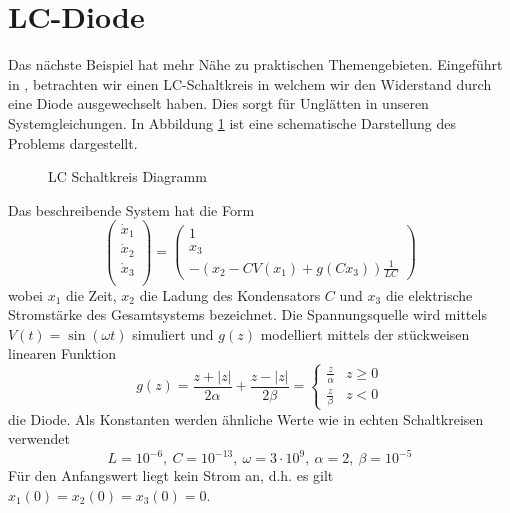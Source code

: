\section{LC-Diode}\label{sec:expLc}
Das nächste Beispiel hat mehr Nähe zu praktischen Themengebieten. Eingeführt in \cite{boeck2014experiments}, betrachten wir einen LC-Schaltkreis in welchem wir den Widerstand durch eine Diode ausgewechselt haben. Dies sorgt für Unglätten in unseren Systemgleichungen. In Abbildung \ref{fig:lcDiode} ist eine schematische Darstellung des Problems dargestellt. 
\begin{figure}[H]
\centering

\caption{LC Schaltkreis Diagramm}
\label{fig:lcDiode}
\end{figure}
Das beschreibende System hat die Form
\begin{equation}
 \begin{pmatrix}
  \dot x_1\\
  \dot x_2\\
  \dot x_3\\
 \end{pmatrix}
 = 
 \begin{pmatrix}
  1\\
  x_3\\
  -\left(x_2-CV(x_1) + g(Cx_3)\right)\frac{1}{LC}
 \end{pmatrix}
 \label{eq:lcDiodeSystemSimple}
\end{equation}
wobei $x_1$ die Zeit, $x_2$ die Ladung des Kondensators $C$ und $x_3$ die elektrische Stromstärke des Gesamtsystems bezeichnet. Die Spannungsquelle wird mittels $V(t)=\sin(\omega t)$ simuliert und $g(z)$ modelliert mittels der stückweisen linearen Funktion 
\begin{equation}
 g(z) = \frac{z+|z|}{2\alpha} + \frac{z-|z|}{2\beta}  = \begin{cases}
                                                         \frac{z}{\alpha} & z\geq 0\\
                                                         \frac{z}{\beta}  & z<0
                                                        \end{cases}
\label{eq:lcOde}                                                       
\end{equation}
die Diode. Als Konstanten werden ähnliche Werte wie in echten Schaltkreisen verwendet
\[
 L= 10^{-6},~ C=10^{-13},~ \omega = 3\cdot 10^{9},~\alpha = 2,~\beta = 10^{-5}
\]
Für den Anfangswert liegt kein Strom an, d.h. es gilt $x_1(0)  = x_2(0) = x_3(0) = 0$.

